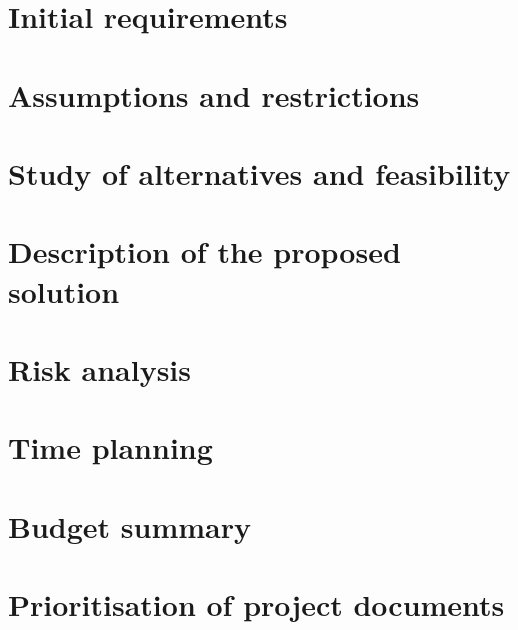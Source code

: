 \section{Initial requirements}
\section{Assumptions and restrictions}
\section{Study of alternatives and feasibility}
\section{Description of the proposed solution}
\section{Risk analysis}
\section{Time planning}
\section{Budget summary}
\section{Prioritisation of project documents}

